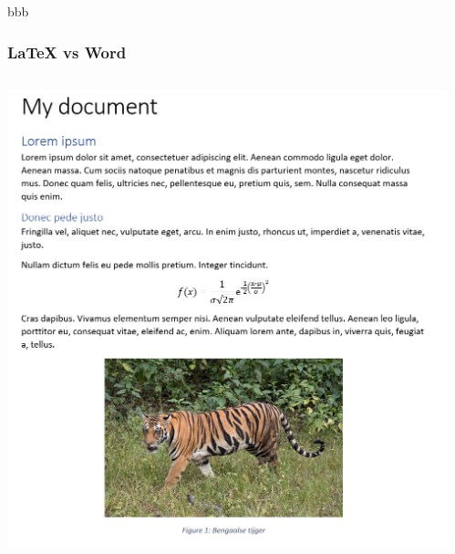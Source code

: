 \documentclass[../presentatie.tex]{subfiles}
\begin{document}
\clearrecentlist


\begin{frame}
    bbb
\end{frame}

\begin{frame}
    \frametitle{\LaTeX{} vs Word}

    \begin{columns}
        \begin{column}{0.5\textwidth}
            \includegraphics[width=\linewidth,height=0.8\textheight,keepaspectratio]{assets/basicDocWordSnippet.png}
        \end{column}
        \begin{column}{0.5\textwidth}

\end{column}
\end{columns}
\end{frame}
\end{document}
